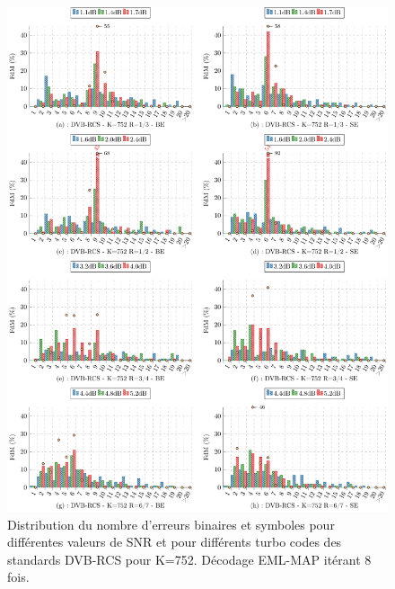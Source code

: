 \begin{figure}[!ht] 
	\centering
	\vspace*{-1em}
	\hspace*{-1cm}
	\includegraphics[width=1.05\textwidth]{main/ch3_fig/be/dvb/tikz/be_752.pdf}
	\caption{Distribution du nombre d'erreurs binaires et symboles pour différentes valeurs de SNR et pour différents turbo codes des 
	standards DVB-RCS pour K=752.	Décodage EML-MAP itérant 8 fois. \label{fig:be_dvb752}}
\end{figure}

